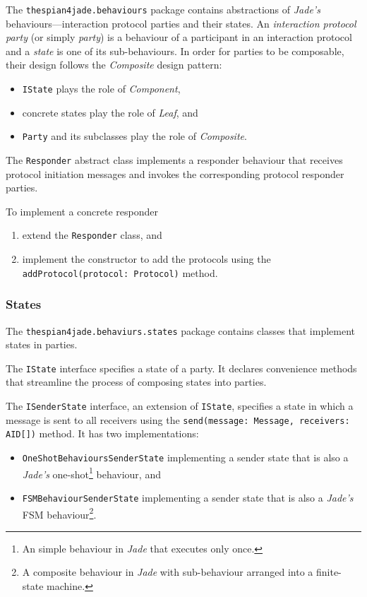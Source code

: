 The \texttt{thespian4jade.behaviours} package contains abstractions of \textit{Jade's} behaviours---interaction protocol parties and their states.
An \textit{interaction protocol party} (or simply \textit{party}) is a behaviour of a participant in an interaction protocol and a \textit{state} is one of its sub-behaviours.
In order for parties to be composable, their design follows the \textit{Composite} design pattern:
\begin{itemize}
	\item \texttt{IState} plays the role of \textit{Component},
	\item concrete states play the role of \textit{Leaf}, and
	\item \texttt{Party} and its subclasses play the role of \textit{Composite}.
\end{itemize}

The \texttt{Responder} abstract class implements a responder behaviour that receives protocol initiation messages and invokes the corresponding protocol responder parties.

To implement a concrete responder
\begin{enumerate}
	\item extend the \texttt{Responder} class, and
	\item implement the constructor to add the protocols using the \texttt{addProtocol(protocol: Protocol)} method.
\end{enumerate}

\subsubsection{States}

The \texttt{thespian4jade.behaviurs.states} package contains classes that implement states in parties.

The \texttt{IState} interface specifies a state of a party.
It declares convenience methods that streamline the process of composing states into parties.

The \texttt{ISenderState} interface, an extension of \texttt{IState}, specifies a state in which a message is sent to all receivers using the \texttt{send(message: Message, receivers: AID[])} method.
It has two implementations:
\begin{itemize}
	\item \texttt{OneShotBehavioursSenderState} implementing a sender state that is also a \textit{Jade's} one-shot\footnote{An simple behaviour in \textit{Jade} that executes only once.} behaviour, and
	\item \texttt{FSMBehaviourSenderState} implementing a sender state that is also a \textit{Jade's} FSM behaviour\footnote{A composite behaviour in \textit{Jade} with sub-behaviour arranged into a finite-state machine.}.
\end{itemize}


